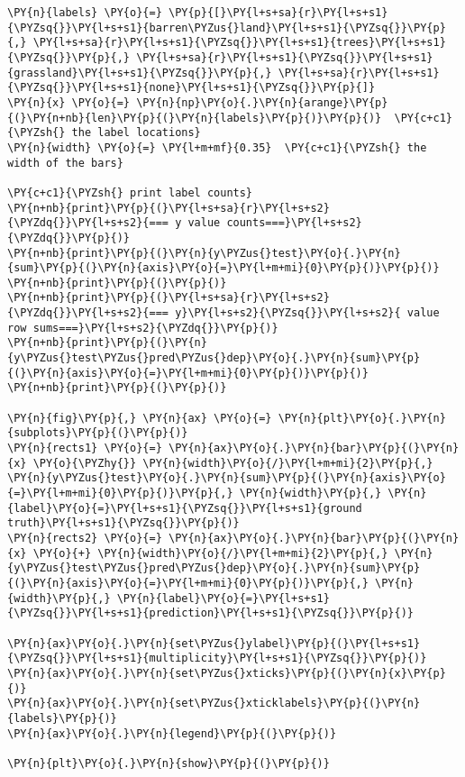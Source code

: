     \begin{tcolorbox}[breakable, size=fbox, boxrule=1pt, pad at break*=1mm,colback=cellbackground, colframe=cellborder]
\begin{Verbatim}[commandchars=\\\{\}]
\PY{n}{labels} \PY{o}{=} \PY{p}{[}\PY{l+s+sa}{r}\PY{l+s+s1}{\PYZsq{}}\PY{l+s+s1}{barren\PYZus{}land}\PY{l+s+s1}{\PYZsq{}}\PY{p}{,} \PY{l+s+sa}{r}\PY{l+s+s1}{\PYZsq{}}\PY{l+s+s1}{trees}\PY{l+s+s1}{\PYZsq{}}\PY{p}{,} \PY{l+s+sa}{r}\PY{l+s+s1}{\PYZsq{}}\PY{l+s+s1}{grassland}\PY{l+s+s1}{\PYZsq{}}\PY{p}{,} \PY{l+s+sa}{r}\PY{l+s+s1}{\PYZsq{}}\PY{l+s+s1}{none}\PY{l+s+s1}{\PYZsq{}}\PY{p}{]}
\PY{n}{x} \PY{o}{=} \PY{n}{np}\PY{o}{.}\PY{n}{arange}\PY{p}{(}\PY{n+nb}{len}\PY{p}{(}\PY{n}{labels}\PY{p}{)}\PY{p}{)}  \PY{c+c1}{\PYZsh{} the label locations}
\PY{n}{width} \PY{o}{=} \PY{l+m+mf}{0.35}  \PY{c+c1}{\PYZsh{} the width of the bars}

\PY{c+c1}{\PYZsh{} print label counts}
\PY{n+nb}{print}\PY{p}{(}\PY{l+s+sa}{r}\PY{l+s+s2}{\PYZdq{}}\PY{l+s+s2}{=== y value counts===}\PY{l+s+s2}{\PYZdq{}}\PY{p}{)}
\PY{n+nb}{print}\PY{p}{(}\PY{n}{y\PYZus{}test}\PY{o}{.}\PY{n}{sum}\PY{p}{(}\PY{n}{axis}\PY{o}{=}\PY{l+m+mi}{0}\PY{p}{)}\PY{p}{)}
\PY{n+nb}{print}\PY{p}{(}\PY{p}{)}
\PY{n+nb}{print}\PY{p}{(}\PY{l+s+sa}{r}\PY{l+s+s2}{\PYZdq{}}\PY{l+s+s2}{=== y}\PY{l+s+s2}{\PYZsq{}}\PY{l+s+s2}{ value row sums===}\PY{l+s+s2}{\PYZdq{}}\PY{p}{)}
\PY{n+nb}{print}\PY{p}{(}\PY{n}{y\PYZus{}test\PYZus{}pred\PYZus{}dep}\PY{o}{.}\PY{n}{sum}\PY{p}{(}\PY{n}{axis}\PY{o}{=}\PY{l+m+mi}{0}\PY{p}{)}\PY{p}{)}
\PY{n+nb}{print}\PY{p}{(}\PY{p}{)}

\PY{n}{fig}\PY{p}{,} \PY{n}{ax} \PY{o}{=} \PY{n}{plt}\PY{o}{.}\PY{n}{subplots}\PY{p}{(}\PY{p}{)}
\PY{n}{rects1} \PY{o}{=} \PY{n}{ax}\PY{o}{.}\PY{n}{bar}\PY{p}{(}\PY{n}{x} \PY{o}{\PYZhy{}} \PY{n}{width}\PY{o}{/}\PY{l+m+mi}{2}\PY{p}{,} \PY{n}{y\PYZus{}test}\PY{o}{.}\PY{n}{sum}\PY{p}{(}\PY{n}{axis}\PY{o}{=}\PY{l+m+mi}{0}\PY{p}{)}\PY{p}{,} \PY{n}{width}\PY{p}{,} \PY{n}{label}\PY{o}{=}\PY{l+s+s1}{\PYZsq{}}\PY{l+s+s1}{ground truth}\PY{l+s+s1}{\PYZsq{}}\PY{p}{)}
\PY{n}{rects2} \PY{o}{=} \PY{n}{ax}\PY{o}{.}\PY{n}{bar}\PY{p}{(}\PY{n}{x} \PY{o}{+} \PY{n}{width}\PY{o}{/}\PY{l+m+mi}{2}\PY{p}{,} \PY{n}{y\PYZus{}test\PYZus{}pred\PYZus{}dep}\PY{o}{.}\PY{n}{sum}\PY{p}{(}\PY{n}{axis}\PY{o}{=}\PY{l+m+mi}{0}\PY{p}{)}\PY{p}{,} \PY{n}{width}\PY{p}{,} \PY{n}{label}\PY{o}{=}\PY{l+s+s1}{\PYZsq{}}\PY{l+s+s1}{prediction}\PY{l+s+s1}{\PYZsq{}}\PY{p}{)}

\PY{n}{ax}\PY{o}{.}\PY{n}{set\PYZus{}ylabel}\PY{p}{(}\PY{l+s+s1}{\PYZsq{}}\PY{l+s+s1}{multiplicity}\PY{l+s+s1}{\PYZsq{}}\PY{p}{)}
\PY{n}{ax}\PY{o}{.}\PY{n}{set\PYZus{}xticks}\PY{p}{(}\PY{n}{x}\PY{p}{)}
\PY{n}{ax}\PY{o}{.}\PY{n}{set\PYZus{}xticklabels}\PY{p}{(}\PY{n}{labels}\PY{p}{)}
\PY{n}{ax}\PY{o}{.}\PY{n}{legend}\PY{p}{(}\PY{p}{)}

\PY{n}{plt}\PY{o}{.}\PY{n}{show}\PY{p}{(}\PY{p}{)}
\end{Verbatim}
\end{tcolorbox}

